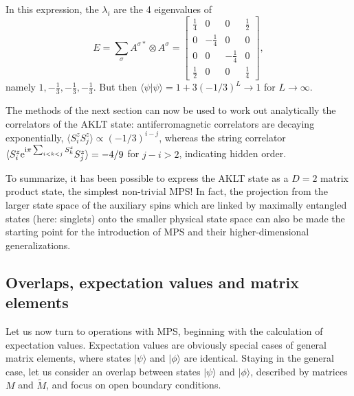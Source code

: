 \documentclass[a4paper,10pt,oneside,onecolumn,1p,times]{elsarticle}
\newcommand{\eul}{{\rm e }}
\newcommand{\imag}{{\rm i }}
\newcommand{\ket}[1]{\mbox{$| #1  \rangle$}}
\newcommand{\braket}[2]{\mbox{$\langle #1  | #2 \rangle$}} 	%
\begin{document}
In this expression, the $\lambda_i$ are the 4 eigenvalues of 
\begin{equation}
E = \sum_\sigma A^{\sigma*} \otimes A^{\sigma} = \left[ \begin{array}{cccc} 
\frac{1}{4} & 0 & 0 & \frac{1}{2} \\
0 & -\frac{1}{4} & 0 & 0 \\
0 & 0 & -\frac{1}{4} & 0 \\
\frac{1}{2} & 0 & 0 & \frac{1}{4}
\end{array} \right] ,
\end{equation}
namely $1,-\frac{1}{3},-\frac{1}{3},-\frac{1}{3}$. But then $\braket{\psi}{\psi} = 1 + 3(-1/3)^L \rightarrow 1$ for $L\rightarrow\infty$.

The methods of the next section can now be used to work out analytically the correlators of the AKLT state:  antiferromagnetic correlators are decaying exponentially, $\langle S^z_i S^z_j \rangle \propto (-1/3)^{i-j}$, whereas the string correlator $\langle S^z_i \eul^{\imag \pi\sum_{i<k<j} S^z_k}S^z_j \rangle =-4/9$ for $j-i>2$, indicating hidden order.

To summarize, it has been possible to express the AKLT state as a $D=2$ matrix product state, the simplest non-trivial MPS! In fact, the projection from the larger state space of the auxiliary spins which are linked by maximally entangled states (here: singlets) onto the smaller physical state space can also be made the starting point for the introduction of MPS and their higher-dimensional generalizations\cite{VerstraetePorras04,VerstraeteCirac04}. 

\subsection{Overlaps, expectation values and matrix elements}

Let us now turn to operations with MPS, beginning with the calculation of expectation values.
Expectation values are obviously special cases of general matrix elements, where states $\ket{\psi}$ and $\ket{\phi}$ are identical. Staying in the general case, let us consider an overlap between states $\ket{\psi}$ and $\ket{\phi}$, described by matrices $M$ and $\tilde{M}$, and focus on open boundary conditions. 
\end{document}
